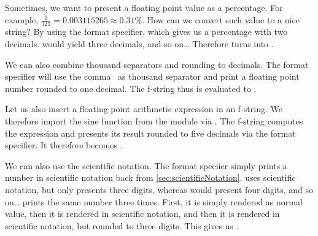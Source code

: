 %
\begin{sloppypar}%
Sometimes, we want to present a floating point value as a percentage.
For example, $\frac{1}{321}=0.003115265\approx0.31\%$.
How can we convert such value to a nice string?
By using the  format specifier, which gives us a percentage with two decimals.
 would yield three decimals, and so on{\dots}
Therefore  turns into .%
\end{sloppypar}%
%
\begin{sloppypar}%
We can also combine thousand separators and rounding to decimals.
The format specifier  will use the comma~\inQuotes{,} as thousand separator and print a floating point number rounded to one decimal.
The f-string  thus is evaluated to .%
\end{sloppypar}%
%
\begin{sloppypar}%
Let us also insert a floating point arithmetic expression in an f-string.
We therefore import the sine function  from the  module via .
The f-string  computes the expression  and presents its result rounded to five decimals via the  format specifier.
It therefore becomes .%
\end{sloppypar}%
%
\begin{sloppypar}%
We can also use the scientific notation.
The format speciier  simply prints a number in scientific notation back from \cref{sec:scientificNotation}.
 uses scientific notation, but only presents three digits, whereas  would present four digits, and so on{\dots}
 prints the same number three times.
First, it is simply rendered as normal  value, then it is rendered in scientific notation, and then it is rendered in scientific notation, but rounded to three digits.
This gives us .%
\end{sloppypar}%
